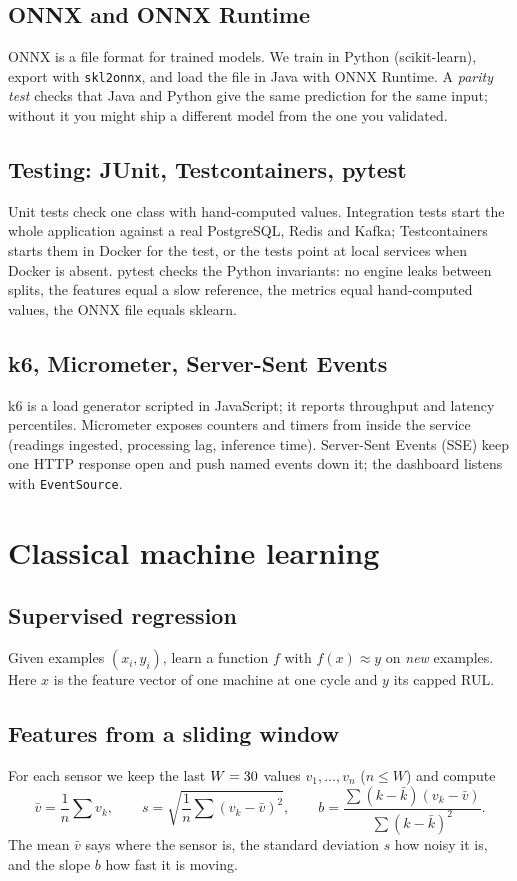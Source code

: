 \documentclass[11pt,a4paper]{article}
\begin{document}
\subsection{ONNX and ONNX Runtime}
ONNX is a file format for trained models. We train in Python (scikit-learn), export with \texttt{skl2onnx}, and
load the file in Java with ONNX Runtime. A \emph{parity test} checks that Java and Python give the same
prediction for the same input; without it you might ship a different model from the one you validated.

\subsection{Testing: JUnit, Testcontainers, pytest}
Unit tests check one class with hand-computed values. Integration tests start the whole application against a
real PostgreSQL, Redis and Kafka; Testcontainers starts them in Docker for the test, or the tests point at
local services when Docker is absent. pytest checks the Python invariants: no engine leaks between splits, the
features equal a slow reference, the metrics equal hand-computed values, the ONNX file equals sklearn.

\subsection{k6, Micrometer, Server-Sent Events}
k6 is a load generator scripted in JavaScript; it reports throughput and latency percentiles. Micrometer
exposes counters and timers from inside the service (readings ingested, processing lag, inference time).
Server-Sent Events (SSE) keep one HTTP response open and push named events down it; the dashboard listens
with \texttt{EventSource}.

\section{Classical machine learning}

\subsection{Supervised regression}
Given examples $(x_i, y_i)$, learn a function $f$ with $f(x) \approx y$ on \emph{new} examples. Here $x$ is the
feature vector of one machine at one cycle and $y$ its capped RUL.

\subsection{Features from a sliding window}
For each sensor we keep the last $W=30{}$ values $v_1, \dots, v_n$ ($n \le W$) and compute
\[
\bar v = \frac1n\sum v_k,\qquad
s = \sqrt{\frac1n\sum (v_k-\bar v)^2},\qquad
b = \frac{\sum (k-\bar k)(v_k-\bar v)}{\sum (k-\bar k)^2}.
\]
The mean $\bar v$ says where the sensor is, the standard deviation $s$ how noisy it is, and the slope $b$ how
fast it is moving.
\end{document}
